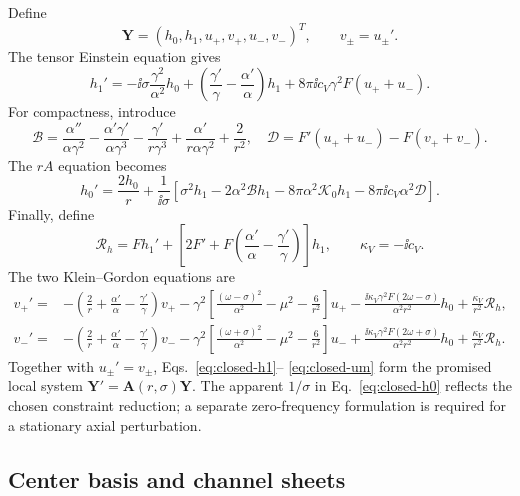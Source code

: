 Define
\begin{equation}
\bm Y=(h_0,h_1,u_+,v_+,u_-,v_-)^T,
\qquad v_\pm=u_\pm'.
\end{equation}
The tensor Einstein equation gives
\begin{equation}
h_1'=-\ii\sigma\frac{\gamma^2}{\alpha^2}h_0
+\left(\frac{\gamma'}{\gamma}-\frac{\alpha'}{\alpha}\right)h_1
+8\pi\ii c_V\gamma^2F(u_++u_-).
\label{eq:closed-h1}
\end{equation}
For compactness, introduce
\begin{equation}
\mathcal B=\frac{\alpha''}{\alpha\gamma^2}
-\frac{\alpha'\gamma'}{\alpha\gamma^3}
-\frac{\gamma'}{r\gamma^3}
+\frac{\alpha'}{r\alpha\gamma^2}+\frac{2}{r^2},
\quad
\mathcal D=F'(u_++u_-)-F(v_++v_-).
\end{equation}
The $rA$ equation becomes
\begin{equation}
h_0'=\frac{2h_0}{r}+\frac{1}{\ii\sigma}\left[
\sigma^2h_1-2\alpha^2\mathcal B h_1
-8\pi\alpha^2\mathcal K_0h_1
-8\pi\ii c_V\alpha^2\mathcal D\right].
\label{eq:closed-h0}
\end{equation}
Finally, define
\begin{equation}
\mathcal R_h=Fh_1'+\left[2F'+F
\left(\frac{\alpha'}{\alpha}-\frac{\gamma'}{\gamma}\right)\right]h_1,
\qquad \kappa_V=-\ii c_V.
\end{equation}
The two Klein--Gordon equations are
\begin{align}
v_+'={}&-\left(\frac2r+\frac{\alpha'}\alpha-\frac{\gamma'}\gamma\right)v_+
-\gamma^2\left[\frac{(\omega-\sigma)^2}{\alpha^2}-\mu^2-
\frac{6}{r^2}\right]u_+
-\frac{\ii\kappa_V\gamma^2F(2\omega-\sigma)}{\alpha^2r^2}h_0
+\frac{\kappa_V}{r^2}\mathcal R_h,
\label{eq:closed-up}\\
v_-'={}&-\left(\frac2r+\frac{\alpha'}\alpha-\frac{\gamma'}\gamma\right)v_-
-\gamma^2\left[\frac{(\omega+\sigma)^2}{\alpha^2}-\mu^2-
\frac{6}{r^2}\right]u_-
+\frac{\ii\kappa_V\gamma^2F(2\omega+\sigma)}{\alpha^2r^2}h_0
+\frac{\kappa_V}{r^2}\mathcal R_h.
\label{eq:closed-um}
\end{align}
Together with $u_\pm'=v_\pm$, Eqs.~\eqref{eq:closed-h1}--
\eqref{eq:closed-um} form the promised local system
$\bm Y'=\bm A(r,\sigma)\bm Y$.  The apparent $1/\sigma$ in
Eq.~\eqref{eq:closed-h0} reflects the chosen constraint reduction; a separate
zero-frequency formulation is required for a stationary axial perturbation.

\subsection{Center basis and channel sheets}

